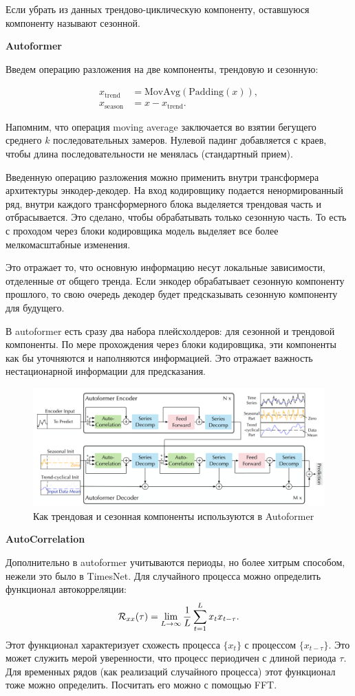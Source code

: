 \documentclass[12pt,fleqn]{article}
\begin{document}
Если убрать из данных трендово-циклическую компоненту, оставшуюся компоненту называют сезонной.

\textbf{Autoformer}

Введем операцию разложения на две компоненты, трендовую и сезонную:

\begin{align*}
x_\text{trend}&=\text{MovAvg}(\text{Padding}(x)),\\
x_\text{season}&=x-x_\text{trend}.
\end{align*}

Напомним, что операция moving average заключается во взятии бегущего среднего $k$ последовательных замеров. Нулевой падинг добавляется с краев, чтобы длина последовательности не менялась (стандартный прием).

Введенную операцию разложения можно применить внутри трансформера архитектуры энкодер-декодер. На вход кодировщику подается ненормированный ряд, внутри каждого трансформерного блока выделяется трендовая часть и отбрасывается. Это сделано, чтобы обрабатывать только сезонную часть. То есть с проходом через блоки кодировщика модель выделяет все более мелкомасштабные изменения.

Это отражает то, что основную информацию несут локальные зависимости, отделенные от общего тренда. Если энкодер обрабатывает сезонную компоненту прошлого, то свою очередь декодер будет предсказывать сезонную компоненту для будущего.

В autoformer \cite{autoformer} есть сразу два набора плейсхолдеров: для сезонной и трендовой компоненты. По мере прохождения через блоки кодировщика, эти компоненты как бы уточняются и наполняются информацией. Это отражает важность нестационарной информации для предсказания.

\begin{figure}[!htb]
    \centering
    \includegraphics[width=0.5\linewidth]{notes.assets/image-20241018010712472.png}
    \caption{Как трендовая и сезонная компоненты используются в Autoformer}
    \label{fig:decomp}
\end{figure}

\textbf{AutoCorrelation}

Дополнительно в autoformer учитываются периоды, но более хитрым способом, нежели это было в TimesNet. Для случайного процесса можно определить функционал автокорреляции:
$$
\mathcal{R}_{xx}(\tau)=\lim_{L\to\infty}{1\over L}\sum_{t=1}^L x_tx_{t-\tau}.
$$
Этот функционал характеризует схожесть процесса $\{x_t\}$ с процессом $\{x_{t-\tau}\}$. Это может служить мерой уверенности, что процесс периодичен с длиной периода $\tau$. Для временных рядов (как реализаций случайного процесса) этот функционал тоже можно определить. Посчитать его можно с помощью FFT.
\end{document}
